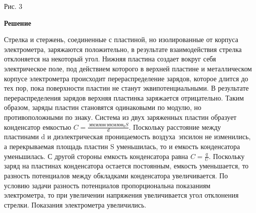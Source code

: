 \documentclass[12pt,a4paper]{article}
\begin{document}
{\begin{center}\end{center}
Рис. $3$
}{
\smallskip\noindent\textbf{Решение}\par
Стрелка и стержень, соединенные с пластиной, но изолированные от корпуса электрометра, заряжаются положительно, в результате взаимодействия стрелка отклоняется на некоторый угол.
Нижняя пластина создает вокруг себя электрическое поле, под действием которого в верхней пластине и металлическом корпусе электрометра происходит перераспределение зарядов, которое длится до тех пор, пока поверхности пластин не станут эквипотенциальными. В результате перераспределения зарядов верхняя пластинка заряжается отрицательно. Таким образом, заряды пластин становятся одинаковыми по модулю, но противоположными по знаку.
Система из двух заряженных пластин образует конденсатор емкостью $C = \frac{\,\text{эпсилон} \,\text{эпсилон} _0S}{d} .$ Поскольку расстояние между пластинами d и диэлектрическая проницаемость воздуха $\,\text{эпсилон}$ не изменились, а перекрываемая площадь пластин S уменьшилась, то и емкость конденсатора уменьшилась.
С другой стороны емкость конденсатора равна $C= \frac{q}{U} .$ Поскольку заряд на пластинах конденсатора остается постоянным, емкость уменьшается, то разность потенциалов между обкладками конденсатора увеличивается.
По условию задачи разность потенциалов пропорциональна показаниям электрометра, то при увеличении напряжения увеличивается угол отклонения стрелки. Показания электрометра увеличились.
}
\end{document}
